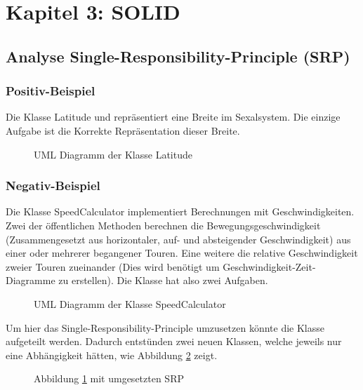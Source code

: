 \section{Kapitel 3: SOLID}

\subsection{Analyse Single-Responsibility-Principle (SRP)}

\subsubsection{Positiv-Beispiel}
 
Die Klasse Latitude und repräsentiert eine Breite im Sexalsystem. Die einzige Aufgabe ist die Korrekte Repräsentation dieser Breite.

\begin{figure}[h]
  \centering
  
  \caption{UML Diagramm der Klasse Latitude}
\end{figure}

\subsubsection{Negativ-Beispiel}

Die Klasse SpeedCalculator implementiert Berechnungen mit Geschwindigkeiten.
Zwei der öffentlichen Methoden berechnen die Bewegungsgeschwindigkeit (Zusammengesetzt aus horizontaler, auf- und absteigender Geschwindigkeit) aus einer oder mehrerer begangener Touren. Eine weitere die relative Geschwindigkeit zweier Touren zueinander (Dies wird benötigt um Geschwindigkeit-Zeit-Diagramme zu erstellen).
Die Klasse hat also zwei Aufgaben.

\begin{figure}[h]
 \label{fig:shitSRP}
  \centering
  
  \caption{UML Diagramm der Klasse SpeedCalculator}
\end{figure}



Um hier das Single-Responsibility-Principle umzusetzen könnte die Klasse aufgeteilt werden. Dadurch entstünden zwei neuen Klassen, welche jeweils nur eine Abhängigkeit hätten, wie Abbildung \ref{fig:betterSRP} zeigt.

\begin{figure}[h]
  \label{fig:betterSRP}
  \centering
  
  \caption{Abbildung \ref{fig:shitSRP} mit umgesetzten SRP}
\end{figure}

